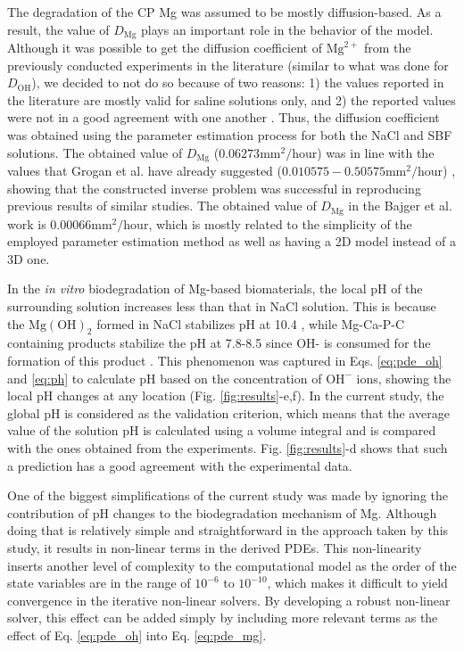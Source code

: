 The degradation of the {CP} Mg was assumed to be mostly diffusion-based. As a result, the value of $D_\mathrm{Mg}$ plays an important role in the behavior of the model. Although it was possible to get the diffusion coefficient of $\mathrm{Mg}^{2+}$ from the previously conducted experiments in the literature (similar to what was done for $D_\mathrm{OH}$), we decided to not do so because of two reasons: 1) the values reported in the literature are mostly valid for saline solutions only, and 2) the reported values were not in a good agreement with one another \cite{Grogan2014,Sun2012}. Thus, the diffusion coefficient was obtained using the parameter estimation process for both the NaCl and {SBF} solutions. The obtained value of $D_\mathrm{Mg}$ ($0.06273 \mathrm{mm}^2/\mathrm{hour}$) was in line with the values that Grogan et al. have already suggested ($0.010575-0.50575 \mathrm{mm}^2/\mathrm{hour}$) \cite{Grogan2014}, showing that the constructed inverse problem was successful in reproducing previous results of similar studies. The obtained value of $D_\mathrm{Mg}$ in the Bajger et al. work \cite{Bajger2016} is $0.00066\mathrm{mm}^2/\mathrm{hour}$, which is mostly related to the simplicity of the employed parameter estimation method as well as having a 2D model instead of a 3D one.


In the \textit{in vitro} biodegradation of Mg-based biomaterials, the local pH of the surrounding solution increases less than that in NaCl solution. This is because the $\mathrm{Mg(OH)}_2$ formed in NaCl stabilizes pH at 10.4 \cite{Santucci2018}, while Mg-Ca-P-C containing products stabilize the pH at 7.8-8.5 since OH- is consumed for the formation of this product \cite{Lamaka2018,Mei2019}. This phenomenon was captured in Eqs. \ref{eq:pde_oh} and \ref{eq:ph} to calculate pH based on the concentration of $\mathrm{OH}^{-}$ ions, showing the local pH changes at any location (Fig. \ref{fig:results}-e,f). In the current study, the global pH is considered as the validation criterion, which means that the average value of the solution pH is calculated using a volume integral and is compared with the ones obtained from the experiments. Fig. \ref{fig:results}-d shows that such a prediction has a good agreement with the experimental data.


One of the biggest simplifications of the current study was made by ignoring the contribution of pH changes to the biodegradation mechanism of Mg. Although doing that is relatively simple and straightforward in the approach taken by this study, it results in non-linear terms in the derived {PDE}s. This non-linearity inserts another level of complexity to the computational model as the order of the state variables are in the range of $10^{-6}$ to $10^{-10}$, which makes it difficult to yield convergence in the iterative non-linear solvers. By developing a robust non-linear solver, this effect can be added simply by including more relevant terms as the effect of Eq. \ref{eq:pde_oh} into Eq. \ref{eq:pde_mg}.

